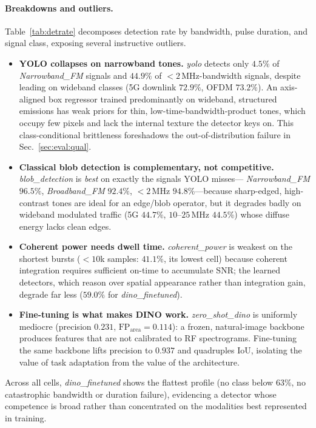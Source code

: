 \paragraph{Breakdowns and outliers.}
Table~\ref{tab:detrate} decomposes detection rate by bandwidth, pulse duration, and
signal class, exposing several instructive outliers.
\begin{itemize}
  \item \textbf{YOLO collapses on narrowband tones.} \emph{yolo} detects only
    $4.5\%$ of \emph{Narrowband\_FM} signals and $44.9\%$ of ${<}2$\,MHz-bandwidth
    signals, despite leading on wideband classes (5G downlink $72.9\%$, OFDM
    $73.2\%$). An axis-aligned box regressor trained predominantly on wideband,
    structured emissions has weak priors for thin, low-time-bandwidth-product tones,
    which occupy few pixels and lack the internal texture the detector keys on. This
    class-conditional brittleness foreshadows the out-of-distribution failure in
    Sec.~\ref{sec:eval:qual}.
  \item \textbf{Classical blob detection is complementary, not competitive.}
    \emph{blob\_detection} is \emph{best} on exactly the signals YOLO misses---
    \emph{Narrowband\_FM} $96.5\%$, \emph{Broadband\_FM} $92.4\%$, ${<}2$\,MHz
    $94.8\%$---because sharp-edged, high-contrast tones are ideal for an edge/blob
    operator, but it degrades badly on wideband modulated traffic (5G $44.7\%$,
    $10$--$25$\,MHz $44.5\%$) whose diffuse energy lacks clean edges.
  \item \textbf{Coherent power needs dwell time.} \emph{coherent\_power} is weakest on
    the shortest bursts (${<}10$k samples: $41.1\%$, its lowest cell) because coherent
    integration requires sufficient on-time to accumulate SNR; the learned detectors,
    which reason over spatial appearance rather than integration gain, degrade far
    less ($59.0\%$ for \emph{dino\_finetuned}).
  \item \textbf{Fine-tuning is what makes DINO work.} \emph{zero\_shot\_dino} is
    uniformly mediocre (precision $0.231$, $\mathrm{FP}_{\text{area}}=0.114$): a
    frozen, natural-image backbone produces features that are not calibrated to RF
    spectrograms. Fine-tuning the same backbone lifts precision to $0.937$ and
    quadruples IoU, isolating the value of task adaptation from the value of the
    architecture.
\end{itemize}
Across all cells, \emph{dino\_finetuned} shows the flattest profile (no class below
$63\%$, no catastrophic bandwidth or duration failure), evidencing a detector whose
competence is broad rather than concentrated on the modalities best represented in
training.

